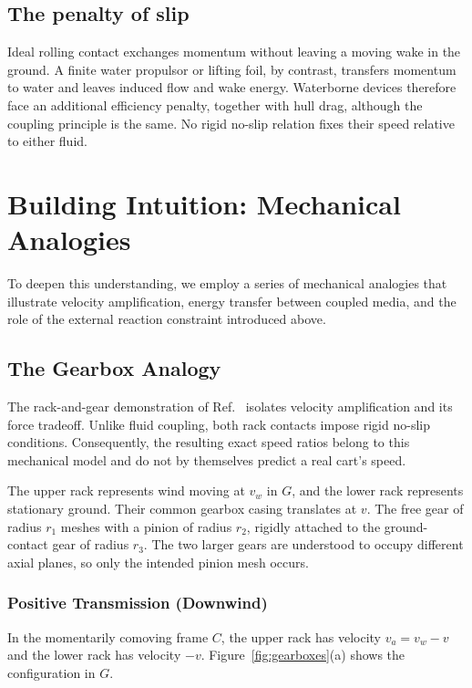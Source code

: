 \documentclass[reprint,aps,pra,longbibliography]{revtex4-2}
\begin{document}
\subsection{The penalty of slip}


Ideal rolling contact exchanges momentum without leaving a moving wake in the ground. A finite water propulsor or lifting foil, by contrast, transfers momentum to water and leaves induced flow and wake energy. Waterborne devices therefore face an additional efficiency penalty, together with hull drag, although the coupling principle is the same. No rigid no-slip relation fixes their speed relative to either fluid.


\section{Building Intuition: Mechanical Analogies}

To deepen this understanding, we employ a series of mechanical analogies that
illustrate velocity amplification, energy transfer between coupled media, and
the role of the external reaction constraint introduced above.

\subsection{The Gearbox Analogy}


The rack-and-gear demonstration of Ref.~\cite{veritasium_2021_physics} isolates velocity amplification and its force tradeoff. Unlike fluid coupling, both rack contacts impose rigid no-slip conditions. Consequently, the resulting exact speed ratios belong to this mechanical model and do not by themselves predict a real cart's speed.

The upper rack represents wind moving at \(v_w\) in \(G\), and the lower rack represents stationary ground. Their common gearbox casing translates at \(v\). The free gear of radius \(r_1\) meshes with a pinion of radius \(r_2\), rigidly attached to the ground-contact gear of radius \(r_3\). The two larger gears are understood to occupy different axial planes, so only the intended pinion mesh occurs.

\subsubsection{Positive Transmission (Downwind)}

In the momentarily comoving frame \(C\), the upper rack has velocity \(v_a=v_w-v\) and the lower rack has velocity \(-v\). Figure~\ref{fig:gearboxes}(a) shows the configuration in \(G\).
\end{document}
